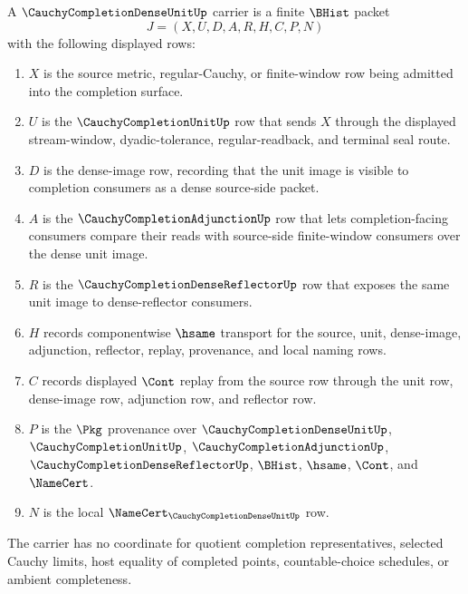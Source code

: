 \begin{definition}
\label{def:cauchy-completion-dense-unit-carrier}
A $\CauchyCompletionDenseUnitUp$ carrier is a finite $\BHist$ packet
$$
J=(X,U,D,A,R,H,C,P,N)
$$
with the following displayed rows:
\begin{enumerate}
\item $X$ is the source metric, regular-Cauchy, or finite-window row being admitted into the completion surface.
\item $U$ is the $\CauchyCompletionUnitUp$ row that sends $X$ through the displayed stream-window, dyadic-tolerance, regular-readback, and terminal seal route.
\item $D$ is the dense-image row, recording that the unit image is visible to completion consumers as a dense source-side packet.
\item $A$ is the $\CauchyCompletionAdjunctionUp$ row that lets completion-facing consumers compare their reads with source-side finite-window consumers over the dense unit image.
\item $R$ is the $\CauchyCompletionDenseReflectorUp$ row that exposes the same unit image to dense-reflector consumers.
\item $H$ records componentwise $\hsame$ transport for the source, unit, dense-image, adjunction, reflector, replay, provenance, and local naming rows.
\item $C$ records displayed $\Cont$ replay from the source row through the unit row, dense-image row, adjunction row, and reflector row.
\item $P$ is the $\Pkg$ provenance over $\CauchyCompletionDenseUnitUp$, $\CauchyCompletionUnitUp$, $\CauchyCompletionAdjunctionUp$, $\CauchyCompletionDenseReflectorUp$, $\BHist$, $\hsame$, $\Cont$, and $\NameCert$.
\item $N$ is the local $\NameCert_{\CauchyCompletionDenseUnitUp}$ row.
\end{enumerate}
The carrier has no coordinate for quotient completion representatives, selected Cauchy limits, host equality of completed points, countable-choice schedules, or ambient completeness.
\end{definition}

